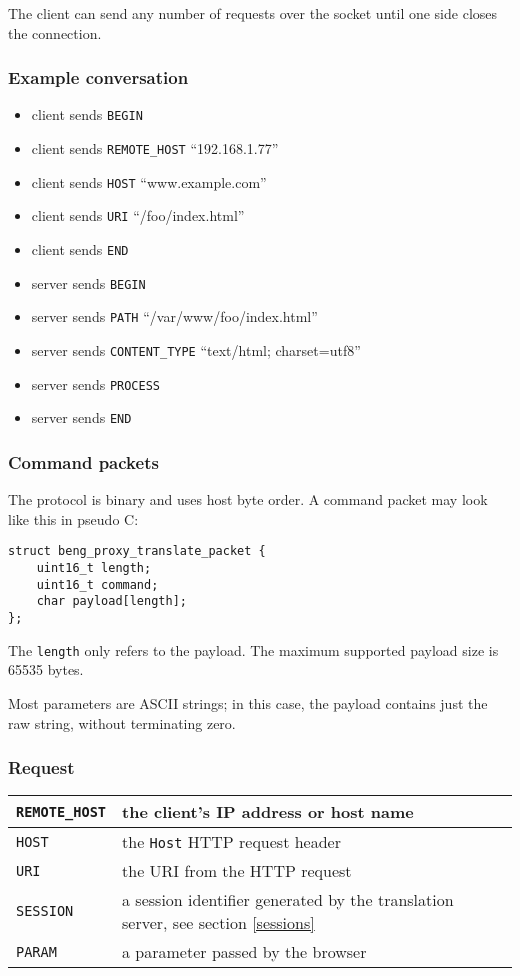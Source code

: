 \documentclass[a4paper,12pt]{article}
\begin{document}
The client can send any number of requests over the socket until one
side closes the connection.

\subsubsection{Example conversation}

\begin{itemize}
\item client sends \texttt{BEGIN}
\item client sends \texttt{REMOTE\_HOST} ``192.168.1.77''
\item client sends \texttt{HOST} ``www.example.com''
\item client sends \texttt{URI} ``/foo/index.html''
\item client sends \texttt{END}
\item server sends \texttt{BEGIN}
\item server sends \texttt{PATH} ``/var/www/foo/index.html''
\item server sends \texttt{CONTENT\_TYPE} ``text/html; charset=utf8''
\item server sends \texttt{PROCESS}
\item server sends \texttt{END}
\end{itemize}

\subsubsection{Command packets}

The protocol is binary and uses host byte order.  A command packet may
look like this in pseudo C:

\begin{verbatim}
struct beng_proxy_translate_packet {
    uint16_t length;
    uint16_t command;
    char payload[length];
};
\end{verbatim}

The \texttt{length} only refers to the payload.  The maximum supported
payload size is 65535 bytes.

Most parameters are ASCII strings; in this case, the payload contains
just the raw string, without terminating zero.

\subsubsection{Request}

\begin{tabular}{|l|p{10cm}|}
\hline
\texttt{REMOTE\_HOST} & the client's IP address or host name \\
\hline
\texttt{HOST} & the \texttt{Host} HTTP request header \\
\hline
\texttt{URI} & the URI from the HTTP request \\
\hline
\texttt{SESSION} & a session identifier generated by the translation
server, see section \ref{sessions} \\
\hline
\texttt{PARAM} & a parameter passed by the browser \\
\hline
\end{tabular}
\end{document}
